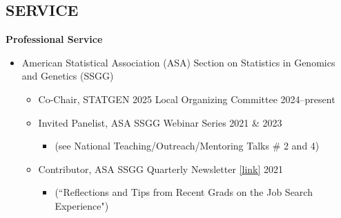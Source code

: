 \documentclass[margin]{res}
\begin{document}
\begin{resume}
\section{SERVICE}  

\textbf{Professional Service}
	\begin{itemize}
	
	\item American Statistical Association (ASA) Section on Statistics in Genomics and Genetics (SSGG)
		\begin{itemize}
		\item Co-Chair, STATGEN 2025 Local Organizing Committee \hfill 2024--present
		\item Invited Panelist, ASA SSGG Webinar Series \hfill 2021 \& 2023 
			\begin{itemize} \vspace{-0.2cm}
			\item[] \begin{footnotesize}(see National Teaching/Outreach/Mentoring Talks \# 2 and 4) \end{footnotesize}
			\end{itemize} \vspace{-0.1cm}
		\item Contributor, ASA SSGG Quarterly Newsletter \href{https://higherlogicdownload.s3.amazonaws.com/AMSTAT/6d11267c-5862-4c31-9f1e-f5a52a11ea5f/UploadedImages/Newsletters/Newsletter_SSGG_2021Sept_final.pdf}{[link]} \hfill 2021
			\begin{itemize} \vspace{-0.2cm}
			\item[]  \begin{footnotesize}(``Reflections and Tips from Recent Grads on the Job Search Experience") \end{footnotesize}
			\end{itemize} %
		\end{itemize}
		

\end{itemize}
\end{resume}
\end{document}
